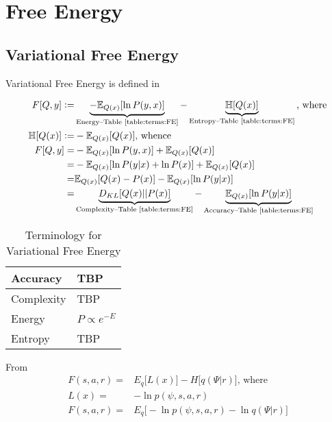 \documentclass[]{article}
\newcommand{\defeq}{\vcentcolon=}
\begin{document}
\section{Free Energy}

\subsection{Variational Free Energy}

Variational Free Energy is defined in \cite{parr2022Active}

\begin{align*}
	F[Q,y] \defeq&\underbrace{ -\mathbb{E}_{Q(x)}[\ln{P(y,x)}] }_\text{Energy--Table \ref{table:terms:FE}}- \underbrace{\mathbb{H}[Q(x)]}_\text{Entropy--Table \ref{table:terms:FE}} \text{, where}\\
	\mathbb{H}[Q(x)] \defeq& - \mathbb{E}_{Q(x)} [Q(x)] \text{, whence}\\
	F[Q,y] = & -\mathbb{E}_{Q(x)}[\ln{P(y,x)}] + \mathbb{E}_{Q(x)}[Q(x)]\\
	=&-\mathbb{E}_{Q(x)}[\ln{P(y\vert x)} + \ln{P(x)}] + \mathbb{E}_{Q(x)}[Q(x)]\\
	=&\mathbb{E}_{Q(x)}[Q(x)-P(x)] -\mathbb{E}_{Q(x)}[\ln{P(y\vert x)}]\\
	 =&\underbrace{ D_{KL}[Q(x)\lvert\rvert P(x)]}_\text{Complexity--Table \ref{table:terms:FE}} - \underbrace{\mathbb{E}_{Q(x)}[\ln{P(y\vert x)}]}_\text{Accuracy--Table \ref{table:terms:FE}} 
\end{align*}

\begin{table}[H]
	\begin{center}
		\caption{Terminology for Variational Free Energy}\label{table:terms:FE}
		\begin{tabular}{|l|l|}\hline
			Accuracy&TBP\\ \hline
			Complexity&TBP\\ \hline
			Energy&$P \propto e^{-E}$\\ \hline
			Entropy&TBP\\ \hline
		\end{tabular}
	\end{center}
\end{table}



From \cite{friston2016therefore}
\begin{align*}
	F(s,a,r) =& E_q\big[L(x)\big]-H\big[q(\Psi\vert r)\big] \text{, where}\\
	L(x) =& -\ln{p(\psi,s,a,r)}\\
	F(s,a,r) =&  E_q\big[ -\ln{p(\psi,s,a,r)} - \ln{q(\Psi\vert r)}\big]
\end{align*}
\end{document}
